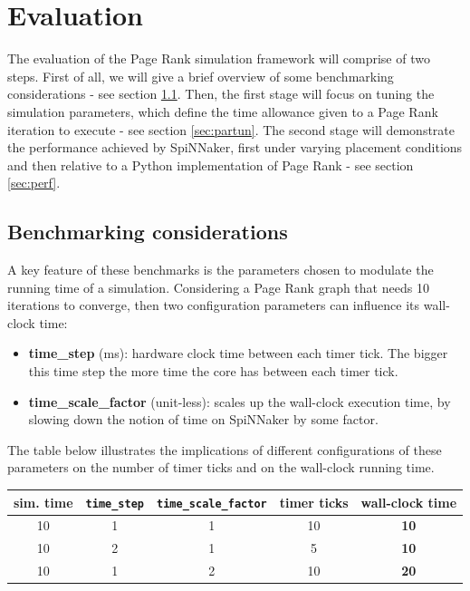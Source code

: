 \section{Evaluation} \label{sec:eval}

The evaluation of the Page Rank simulation framework will comprise of two steps. First of all, we will give a brief overview of some benchmarking considerations - see section \ref{sec:bench}. Then, the first stage will focus on tuning the simulation parameters, which define the time allowance given to a Page Rank iteration to execute - see section \ref{sec:partun}. The second stage will demonstrate the performance achieved by SpiNNaker, first under varying placement conditions and then relative to a Python implementation of Page Rank - see section \ref{sec:perf}. \\

\subsection{Benchmarking  considerations} \label{sec:bench}

A key feature of these benchmarks is the parameters chosen to modulate the running time of a simulation. Considering a Page Rank graph that needs 10 iterations to converge, then two configuration parameters can influence its wall-clock time:

\begin{itemize}
\item \textbf{time\_step} (ms): hardware clock time between each timer tick. The bigger this time step the more time the core has between each timer tick.
\item \textbf{time\_scale\_factor} (unit-less): scales up the wall-clock execution time, by slowing down the notion of time on SpiNNaker by some factor. 
\end{itemize}

The table below illustrates the implications of different configurations of these parameters on the number of timer ticks and on the wall-clock running time.

\begin{center}
\begin{tabular}{ |c|c|c|c|c| }
 \hline
 sim. time & \texttt{time\_step} & \texttt{time\_scale\_factor} & \textbf{timer ticks} & \textbf{wall-clock time}  \\ 
 \hline
10 & 1 & 1 & 10 & \textbf{10} \\ 
10 & 2 & 1 & 5 & \textbf{10} \\ 
10 & 1 & 2 & 10 & \textbf{20} \\ 
 \hline
\end{tabular}
\end{center} 

